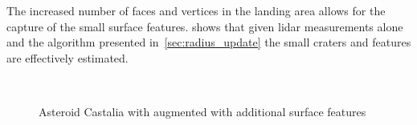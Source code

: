 The increased number of faces and vertices in the landing area allows for the capture of the small surface features.
 shows that given \gls{lidar} measurements alone and the algorithm presented in~\cref{sec:radius_update} the small craters and features are effectively estimated.
\begin{figure}[htbp]
    \centering
    ~
    \caption{Asteroid Castalia with augmented with additional surface features~\label{fig:castalia_refinement}}
\end{figure}

